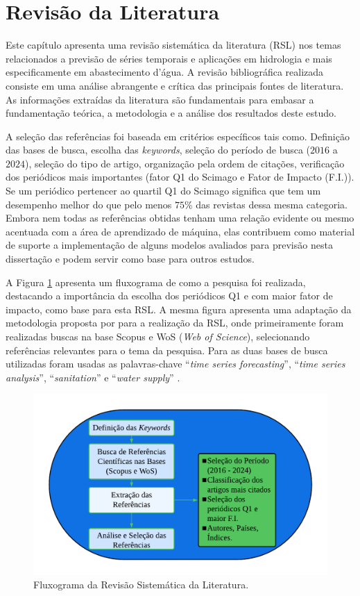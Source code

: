 \section{Revis\~ao da Literatura}\label{sec:refteo}

Este capítulo apresenta uma revisão sistemática  da literatura (RSL) nos temas relacionados a previsão de séries temporais e aplicações em hidrologia e mais especificamente em abastecimento d'água. A revisão bibliográfica realizada consiste em uma análise abrangente e crítica das principais fontes de literatura. As informações extraídas da literatura são fundamentais para embasar a fundamentação teórica, a metodologia e a análise dos resultados deste estudo.


A seleção das referências foi baseada em critérios específicos tais como. Definição das bases de busca, escolha das \textit{keywords}, seleção do período de busca ($2016$ a $2024$), seleção do tipo de artigo, organização pela ordem de citações, verificação dos periódicos mais importantes (fator Q1 do Scimago e Fator de Impacto (F.I.)). Se um periódico pertencer ao quartil Q1 do Scimago significa que tem um desempenho melhor do que pelo menos $75$\% das revistas dessa mesma categoria. Embora nem todas as referências obtidas tenham uma relação evidente ou mesmo acentuada com a área de aprendizado de máquina, elas contribuem como material de suporte a implementação de alguns modelos avaliados para previsão nesta dissertação e podem servir como base para outros estudos.

A Figura \ref{fig:serie-temporal} apresenta um fluxograma de como a pesquisa foi realizada, destacando a importância da escolha dos periódicos Q1 e com maior fator de impacto, como base para esta RSL. A mesma figura apresenta uma adaptação da metodologia proposta por  para a realização da RSL, onde primeiramente foram realizadas buscas na base Scopus e WoS (\textit{Web of Science}), selecionando referências relevantes para o tema da pesquisa. Para as duas bases de busca utilizadas foram usadas as palavras-chave ``\textit{time series forecasting}'', ``\textit{time series analysis}'', ``\textit{sanitation}'' e ``\textit{water supply}'' .

\begin{figure}[!htb]
	\centering
	\caption{Fluxograma da Revisão Sistemática da Literatura.}
	\label{fig:serie-temporal}
	\includegraphics[width=0.7\linewidth]{Revisao/Figuras/Figura2.pdf}
\end{figure}

